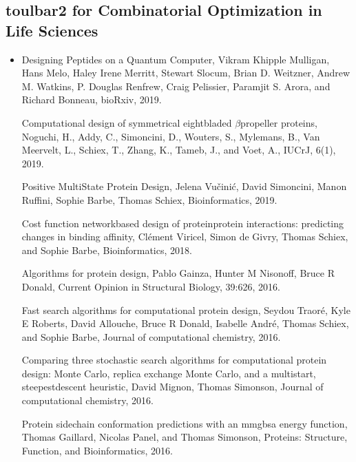 \documentclass[letterpaper,10pt,openany,oneside,english]{sphinxmanual}
\begin{document}
\subsection{toulbar2 for Combinatorial Optimization in Life Sciences}
\label{\detokenize{publications:toulbar2-for-combinatorial-optimization-in-life-sciences}}\begin{itemize}
\item {} 
\sphinxAtStartPar
{}

\sphinxAtStartPar
Designing Peptides on a Quantum Computer,
Vikram Khipple Mulligan, Hans Melo, Haley Irene Merritt, Stewart Slocum, Brian D. Weitzner, Andrew M. Watkins, P. Douglas Renfrew, Craig Pelissier, Paramjit S. Arora, and Richard Bonneau,
bioRxiv, 2019.

\sphinxAtStartPar
Computational design of symmetrical eight\sphinxhyphen{}bladed \(\beta\)\sphinxhyphen{}propeller proteins,
Noguchi, H., Addy, C., Simoncini, D., Wouters, S., Mylemans, B., Van Meervelt, L., Schiex, T., Zhang, K., Tameb, J., and Voet, A.,
IUCrJ, 6(1), 2019.

\sphinxAtStartPar
Positive Multi\sphinxhyphen{}State Protein Design,
Jelena Vučinić, David Simoncini, Manon Ruffini, Sophie Barbe, Thomas Schiex,
Bioinformatics, 2019.

\sphinxAtStartPar
Cost function network\sphinxhyphen{}based design of protein\sphinxhyphen{}protein interactions: predicting changes in binding affinity,
Clément Viricel, Simon de Givry, Thomas Schiex, and Sophie Barbe,
Bioinformatics, 2018.

\sphinxAtStartPar
Algorithms for protein design,
Pablo Gainza, Hunter M Nisonoff, Bruce R Donald,
Current Opinion in Structural Biology, 39:6\sphinxhyphen{}26, 2016.

\sphinxAtStartPar
Fast search algorithms for computational protein design,
Seydou Traoré, Kyle E Roberts, David Allouche, Bruce R Donald, Isabelle André, Thomas Schiex, and Sophie Barbe,
Journal of computational chemistry, 2016.

\sphinxAtStartPar
Comparing three stochastic search algorithms for computational protein design: Monte Carlo, replica exchange Monte Carlo, and a multistart, steepest\sphinxhyphen{}descent heuristic,
David Mignon, Thomas Simonson,
Journal of computational chemistry, 2016.

\sphinxAtStartPar
Protein sidechain conformation predictions with an mmgbsa energy function,
Thomas Gaillard, Nicolas Panel, and Thomas Simonson,
Proteins: Structure, Function, and Bioinformatics, 2016.


\end{itemize}
\end{document}
